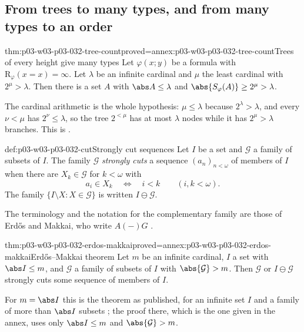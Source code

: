 \subsection{From trees to many types, and from many types to an order}

\begin{hblemma}{thm:p03-w03-p03-032-tree-count}{proved=annex:p03-w03-p03-032-tree-count}{Trees of every height give many types}
Let \(\varphi(x;y)\) be a formula with \(\mathrm R_\varphi(x=x)=\infty\).
Let \(\lambda\) be an infinite cardinal and \(\mu\) the least cardinal with
\(2^\mu>\lambda\).  Then there is a set \(A\) with \(\abs A\leq\lambda\) and
\(\abs{S_\varphi(A)}\geq2^\mu>\lambda\).
\end{hblemma}

The cardinal arithmetic is the whole hypothesis: \(\mu\leq\lambda\) because
\(2^\lambda>\lambda\), and every \(\nu<\mu\) has \(2^\nu\leq\lambda\), so the
tree \(2^{<\mu}\) has at most \(\lambda\) nodes while it has \(2^\mu>\lambda\)
branches.  This is \cite[Lemma~2.3, p.~299]{Shelah1971Stability}.

\begin{hbdefinition}{def:p03-w03-p03-032-cut}{Strongly cut sequences}
Let \(I\) be a set and \(\mathcal G\) a family of subsets of \(I\).  The
family \(\mathcal G\) \emph{strongly cuts} a sequence
\((a_n)_{n<\omega}\) of members of \(I\) when there are
\(X_k\in\mathcal G\) for \(k<\omega\) with
\[
  a_i\in X_k\quad\Longleftrightarrow\quad i<k
  \qquad(i,k<\omega).
\]
The family \(\{I\setminus X:X\in\mathcal G\}\) is written
\(I\ominus\mathcal G\).
\end{hbdefinition}

The terminology and the notation for the complementary family are those of
Erd\H{o}s and Makkai, who write \(A(-)G\) \cite[Theorem]{ErdosMakkai1966}.

\begin{hbtheorem}{thm:p03-w03-p03-032-erdos-makkai}{proved=annex:p03-w03-p03-032-erdos-makkai}{Erd\H{o}s--Makkai theorem}
Let \(m\) be an infinite cardinal, \(I\) a set with \(\abs I\leq m\), and
\(\mathcal G\) a family of subsets of \(I\) with
\(\abs{\mathcal G}>m\).  Then \(\mathcal G\) or \(I\ominus\mathcal G\)
strongly cuts some sequence of members of \(I\).
\end{hbtheorem}

For \(m=\abs I\) this is the theorem as published, for an infinite set
\(I\) and a family of more than \(\abs I\) subsets
\cite[Theorem]{ErdosMakkai1966}; the proof there, which is the one given in
the annex, uses only \(\abs I\leq m\) and \(\abs{\mathcal G}>m\).

